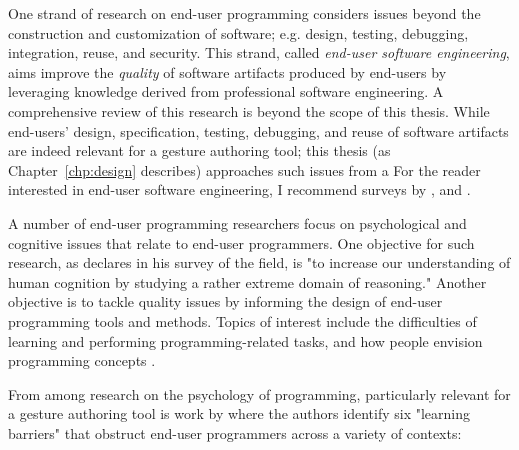 

One strand of research on end-user programming considers issues beyond the construction and customization of software; e.g. design, testing, debugging, integration, reuse, and security. This strand, called \emph{end-user software engineering}, aims improve the \emph{quality} of software artifacts produced by end-users by leveraging knowledge derived from professional software engineering. A comprehensive review of this research is beyond the scope of this thesis. While end-users' design, specification, testing, debugging, and reuse of software artifacts are indeed relevant for a gesture authoring tool; this thesis  (as Chapter~\ref{chp:design} describes) approaches such issues from a  For the reader interested in end-user software engineering, I recommend surveys by \textcite{Burnett:2004}, and \textcite{Ko:2011}.


A number of end-user programming researchers focus on psychological and cognitive issues that relate to end-user programmers. One objective for such research, as \textcite{Blackwell:2006} declares in his survey of the field, is "to increase our understanding of human cognition by studying a rather extreme domain of reasoning." Another objective is to tackle quality issues by informing the design of end-user programming tools and methods. Topics of interest include the difficulties of learning \parencite{Ko:2004, Pea:1987} and performing \parencite{Lewis:1987} programming-related tasks, and how people envision programming concepts \parencite{Pane:2001}.

From among research on the psychology of programming, particularly relevant for a gesture authoring tool is work by \textcite{Ko:2004} where the authors identify six "learning barriers" that obstruct end-user programmers across a variety of contexts:


